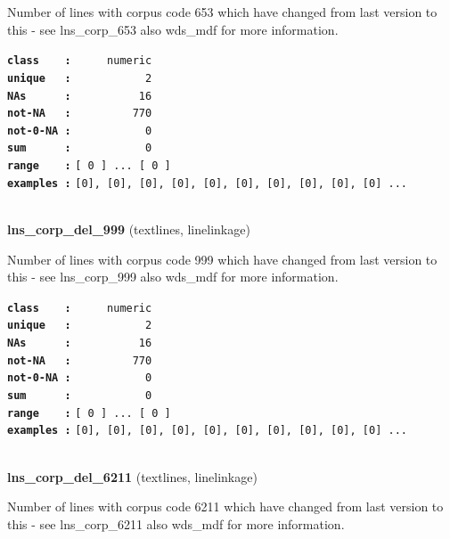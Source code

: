\documentclass[]{article}
\begin{document}
Number of lines with corpus code 653 which have changed from last
version to this - see lns\_corp\_653 also wds\_mdf for more information.

\textbf{\texttt{class\ \ \ \ :}} \texttt{~~~~~numeric}\\
\textbf{\texttt{unique\ \ \ :}} \texttt{~~~~~~~~~~~2}\\
\textbf{\texttt{NAs\ \ \ \ \ \ :}} \texttt{~~~~~~~~~~16}\\
\textbf{\texttt{not-NA\ \ \ :}} \texttt{~~~~~~~~~770}\\
\textbf{\texttt{not-0-NA\ :}} \texttt{~~~~~~~~~~~0}\\
\textbf{\texttt{sum\ \ \ \ \ \ :}} \texttt{~~~~~~~~~~~0}\\
\textbf{\texttt{range\ \ \ \ :}}
\texttt{{[}\ 0\ {]}\ ...\ {[}\ 0\ {]}}\\
\textbf{\texttt{examples\ :}}
\texttt{{[}0{]},\ {[}0{]},\ {[}0{]},\ {[}0{]},\ {[}0{]},\ {[}0{]},\ {[}0{]},\ {[}0{]},\ {[}0{]},\ {[}0{]}\ ...}\\

~

\textbf{lns\_corp\_del\_999} (textlines, linelinkage)

Number of lines with corpus code 999 which have changed from last
version to this - see lns\_corp\_999 also wds\_mdf for more information.

\textbf{\texttt{class\ \ \ \ :}} \texttt{~~~~~numeric}\\
\textbf{\texttt{unique\ \ \ :}} \texttt{~~~~~~~~~~~2}\\
\textbf{\texttt{NAs\ \ \ \ \ \ :}} \texttt{~~~~~~~~~~16}\\
\textbf{\texttt{not-NA\ \ \ :}} \texttt{~~~~~~~~~770}\\
\textbf{\texttt{not-0-NA\ :}} \texttt{~~~~~~~~~~~0}\\
\textbf{\texttt{sum\ \ \ \ \ \ :}} \texttt{~~~~~~~~~~~0}\\
\textbf{\texttt{range\ \ \ \ :}}
\texttt{{[}\ 0\ {]}\ ...\ {[}\ 0\ {]}}\\
\textbf{\texttt{examples\ :}}
\texttt{{[}0{]},\ {[}0{]},\ {[}0{]},\ {[}0{]},\ {[}0{]},\ {[}0{]},\ {[}0{]},\ {[}0{]},\ {[}0{]},\ {[}0{]}\ ...}\\

~

\textbf{lns\_corp\_del\_6211} (textlines, linelinkage)

Number of lines with corpus code 6211 which have changed from last
version to this - see lns\_corp\_6211 also wds\_mdf for more
information.
\end{document}
